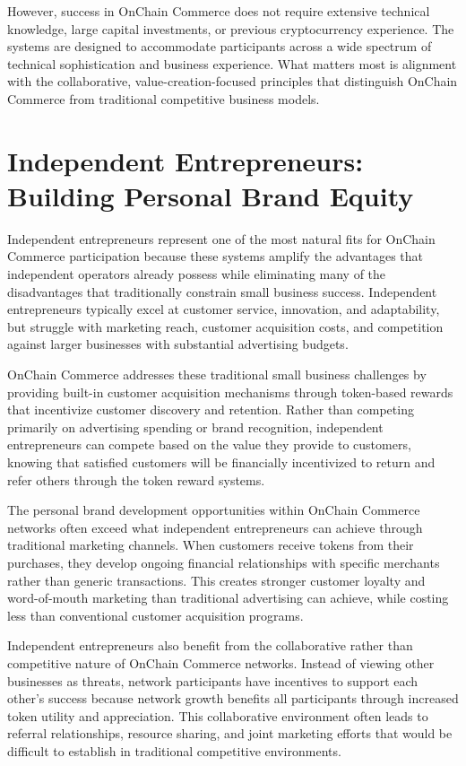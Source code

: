 \documentclass[
  Letterpaper,
]{scrbook}
\begin{document}
However, success in OnChain Commerce does not require extensive
technical knowledge, large capital investments, or previous
cryptocurrency experience. The systems are designed to accommodate
participants across a wide spectrum of technical sophistication and
business experience. What matters most is alignment with the
collaborative, value-creation-focused principles that distinguish
OnChain Commerce from traditional competitive business models.

\section{Independent Entrepreneurs: Building Personal Brand
Equity}\label{independent-entrepreneurs-building-personal-brand-equity}

Independent entrepreneurs represent one of the most natural fits for
OnChain Commerce participation because these systems amplify the
advantages that independent operators already possess while eliminating
many of the disadvantages that traditionally constrain small business
success. Independent entrepreneurs typically excel at customer service,
innovation, and adaptability, but struggle with marketing reach,
customer acquisition costs, and competition against larger businesses
with substantial advertising budgets.

OnChain Commerce addresses these traditional small business challenges
by providing built-in customer acquisition mechanisms through
token-based rewards that incentivize customer discovery and retention.
Rather than competing primarily on advertising spending or brand
recognition, independent entrepreneurs can compete based on the value
they provide to customers, knowing that satisfied customers will be
financially incentivized to return and refer others through the token
reward systems.

The personal brand development opportunities within OnChain Commerce
networks often exceed what independent entrepreneurs can achieve through
traditional marketing channels. When customers receive tokens from their
purchases, they develop ongoing financial relationships with specific
merchants rather than generic transactions. This creates stronger
customer loyalty and word-of-mouth marketing than traditional
advertising can achieve, while costing less than conventional customer
acquisition programs.

Independent entrepreneurs also benefit from the collaborative rather
than competitive nature of OnChain Commerce networks. Instead of viewing
other businesses as threats, network participants have incentives to
support each other's success because network growth benefits all
participants through increased token utility and appreciation. This
collaborative environment often leads to referral relationships,
resource sharing, and joint marketing efforts that would be difficult to
establish in traditional competitive environments.
\end{document}
